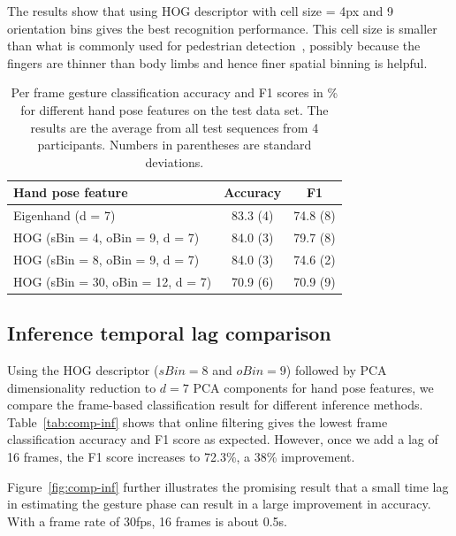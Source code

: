 \documentclass{acm_proc_article-sp}
\begin{document}
The results show that using HOG descriptor with cell size = 4px and 9 orientation bins
gives the best recognition performance. This cell size is smaller than what is commonly used for 
pedestrian detection~\cite{dalal05}, possibly because the fingers are thinner than
body limbs and hence finer spatial binning is helpful.

\begin{table}[tb]
\begin{center}
\caption{Per frame gesture classification accuracy and F1 scores in \% for different
hand pose features on the test data set. The results are the average from all test
sequences from 4 participants. Numbers in parentheses are standard deviations.}
\label{tab:comp-feature}
\begin{tabular}{|l|c|c|}
\hline
\textbf{Hand pose feature} & \textbf{Accuracy} & \textbf{F1} \\
\hline
Eigenhand (d = 7) & 83.3 (4) & 74.8 (8) \\ 
\hline
HOG (sBin = 4, oBin = 9, d = 7) & 84.0 (3) & 79.7 (8)\\
\hline
HOG (sBin = 8, oBin = 9, d = 7) & 84.0 (3) & 74.6 (2)\\
\hline
HOG (sBin = 30, oBin = 12, d = 7) & 70.9 (6) & 70.9 (9)\\
\hline
\end{tabular}
\end{center}
\end{table}

\subsection{Inference temporal lag comparison} \label{sec:comp-inf}
Using the HOG descriptor ($sBin = 8$ and $oBin = 9$) followed by PCA dimensionality
reduction to $d = 7$ PCA components for hand pose features, we compare the frame-based
classification result for different inference methods. Table~\ref{tab:comp-inf}
shows that online filtering gives the lowest frame classification accuracy and F1 score as
expected. However, once we add a lag of 16 frames, the F1 score increases to 72.3\%,
a 38\% improvement. 
 
Figure~\ref{fig:comp-inf}
further illustrates the promising result that a small time lag in estimating the 
gesture phase can result in a large improvement in accuracy. With a frame rate of 30fps, 16 frames is about 0.5s. 
\end{document}
